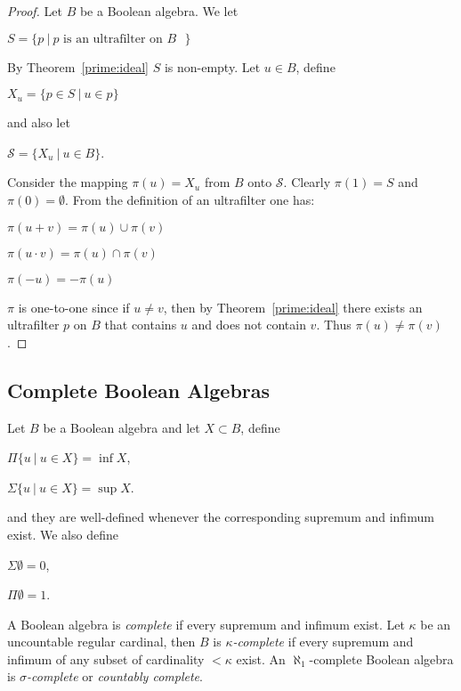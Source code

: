 \documentclass[8pt]{article}
\theoremstyle{definition}
\theoremstyle{definition}
\theoremstyle{definition}
\theoremstyle{definition}
\theoremstyle{definition}
\theoremstyle{definition}
\theoremstyle{definition}
\theoremstyle{definition}
\theoremstyle{definition}
\theoremstyle{definition}
\theoremstyle{definition}
\theoremstyle{definition}
\theoremstyle{definition}
\theoremstyle{definition}
\theoremstyle{question}
\begin{document}
\begin{proof}
Let $B$ be a Boolean algebra. We let
\begin{center}
  $S = \{ p \: | \: \text{$p$ is an ultrafilter on $B$ }\}$
\end{center}
By Theorem~\ref{prime:ideal} $S$ is non-empty. Let $u \in B$, define
\begin{center}
$X_u = \{ p \in S \: | \: u \in p \}$
\end{center}
and also let
\begin{center}
  $\mathcal{S} = \{ X_u \: | \: u \in B \}$.
\end{center}

Consider the mapping $\pi(u) = X_u$ from $B$ onto $\mathcal{S}$. Clearly $\pi(1) = S$ and $\pi(0) = \emptyset$.
From the definition of an ultrafilter one has:
\begin{center}
  $\pi(u + v) = \pi(u) \cup \pi(v)$

  $\pi(u \cdot v) = \pi(u) \cap \pi(v)$

  $\pi(- u) = - \pi(u)$
\end{center}

$\pi$ is one-to-one since if $u \neq v$, then by Theorem~\ref{prime:ideal} there exists an ultrafilter $p$
on $B$ that contains $u$ and does not contain $v$. Thus $\pi(u) \neq \pi(v)$.
\end{proof}

\subsection{Complete Boolean Algebras}

Let $B$ be a Boolean algebra and let $X \subset B$, define
\begin{center}
  $\Pi \{ u \: | \: u \in X \} = \inf X$,

  $\Sigma \{ u \: | \: u \in X \} = \sup X$.
\end{center}
and they are well-defined whenever the corresponding supremum and infimum exist. We also define
\begin{center}
  $\Sigma \emptyset = 0$,

  $\Pi \emptyset = 1$.
\end{center}

A Boolean algebra is \emph{complete} if every supremum and infimum exist. 
Let $\kappa$ be an uncountable regular cardinal, then $B$ is \emph{$\kappa$-complete}
if every supremum and infimum of any subset of cardinality $< \kappa$ exist.
An $\aleph_1$-complete Boolean algebra is \emph{$\sigma$-complete} or \emph{countably complete}.
\end{document}
